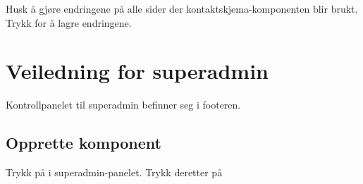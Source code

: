 \begin{figure}[H]
    \centering
    \label{fig:cms-contact-form-email}
\end{figure}


Husk å gjøre endringene på alle sider der kontaktskjema-komponenten blir brukt. Trykk  for å lagre endringene. 

\section{Veiledning for superadmin}
Kontrollpanelet til superadmin befinner seg i footeren.

\begin{figure}[H]
    \centering
    \label{fig:cms-superadmin}
\end{figure}

\subsection{Opprette komponent}
Trykk på  i superadmin-panelet. Trykk deretter på 

\begin{figure}[H]
    \centering
    \label{fig:cms-superadmin-add-component}
\end{figure}

